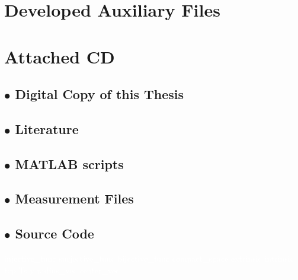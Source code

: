 \begin{appendices}
\chapter{Developed Auxiliary Files}\label{app:auxiliary}


\chapter{Attached CD}\label{app:cd}
\section*{$\bullet$ Digital Copy of this Thesis}
\section*{$\bullet$ Literature}
\section*{$\bullet$ MATLAB scripts}
\section*{$\bullet$ Measurement Files}
\section*{$\bullet$ Source Code}

\end{appendices}
\label{appendixend}

{}
{}
{}
{}
{}
{}
{}
{}
{}
{}
{}
{}
{}
{}
{}
{}
{}
{}
{}

\textcolor{white}{%
	\gls{injective_func} \gls{surjective_func} \gls{bijective_func}  \gls{compact_space}  \gls{extrinsic} \gls{intrinsic} \gls{tcp} \gls{Ts} \gls{y} \gls{radius_vec} \gls{center_vec}}

